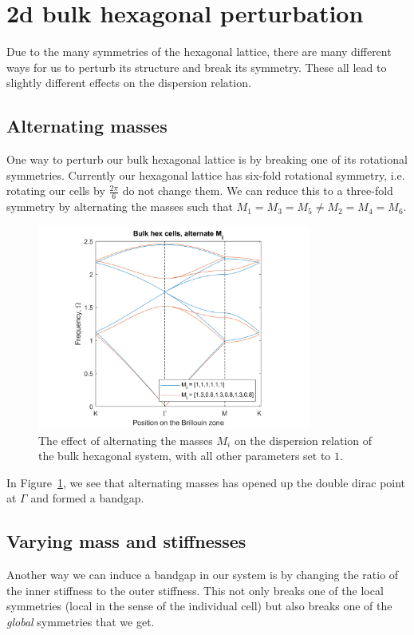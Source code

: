 \section{2d bulk hexagonal perturbation}
Due to the many symmetries of the hexagonal lattice, there are many different
ways for us to perturb its structure and break its symmetry. These all lead to
slightly different effects on the dispersion relation.

\subsection{Alternating masses}
One way to perturb our bulk hexagonal lattice is by breaking one of its
rotational symmetries. Currently our hexagonal lattice has six-fold rotational
symmetry, i.e. rotating our cells by $\frac{2\pi}{6}$ do not change them. We can
reduce this to a three-fold symmetry by alternating the masses such that
$M_1=M_3=M_5 \neq M_2=M_4=M_6$.

\begin{figure}[!h]
\centering
\includegraphics[width=0.8\textwidth]{imgs/hexperturbM.png}
\caption{\label{fig:hexM} The effect of alternating the masses $M_i$ on the
  dispersion relation of the bulk hexagonal system, with all other parameters
  set to $1$.}
\end{figure}

In Figure~\ref{fig:hexM}, we see that alternating masses has opened up the
double dirac point at $\Gamma$ and formed a bandgap.

\subsection{Varying mass and stiffnesses}
Another way we can induce a bandgap in our system is by changing the ratio of
the inner stiffness to the outer stiffness. This not only breaks one of the
local symmetries (local in the sense of the individual cell) but also breaks
one of the \textit{global} symmetries that we get. 

